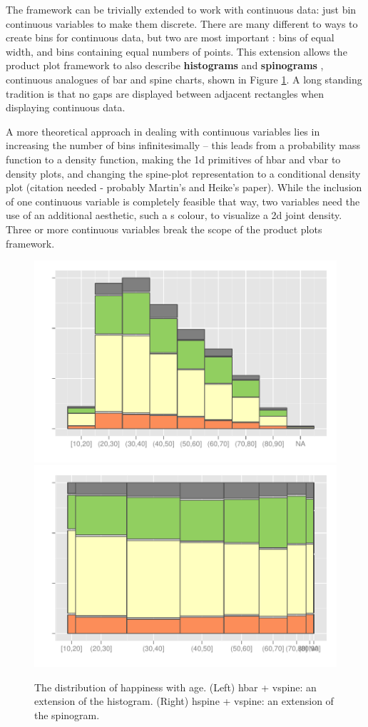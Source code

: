 \documentclass[journal]{vgtc}
\begin{document}
The framework can be trivially extended to work with continuous data: just  bin continuous variables to make them discrete. There are many different to ways to create bins for continuous data, but two are most important \citep{denby:2009}: bins of equal width, and bins containing equal numbers of points. This extension allows the product plot framework to also describe {\bf histograms} and {\bf spinograms} \citep{hummel:1996}, continuous analogues of bar and spine charts, shown in Figure \ref{fig:cont-examples}. A long standing tradition is that no gaps are displayed between adjacent rectangles when displaying continuous data. 

A more theoretical approach in dealing with continuous variables  lies in increasing the number of bins infinitesimally -- this leads from a probability mass function to a density function, making the 1d primitives of hbar and vbar to density plots, and changing the spine-plot representation to a conditional density plot (citation needed - probably Martin's and Heike's paper). While the inclusion of one continuous variable is completely feasible that way, two variables need the use of an additional aesthetic, such a s colour,  to visualize a 2d joint density. Three or more continuous variables break the scope of the product plots framework.

\begin{figure}[htbp]
  \centering
  \includegraphics[width=0.5\linewidth]{cont-hbar}%
  \includegraphics[width=0.5\linewidth]{cont-hspine}
  
  \caption{The distribution of happiness with age. (Left) hbar + vspine: an extension of the histogram. (Right) hspine + vspine: an extension of the spinogram.}
  \label{fig:cont-examples}
\end{figure}
\end{document}
